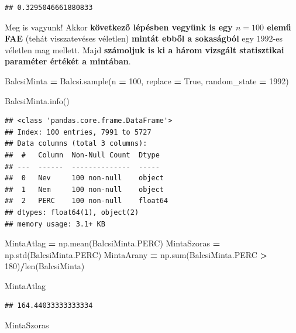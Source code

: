 \documentclass[
]{book}
\newenvironment{Shaded}{\begin{snugshade}}{\end{snugshade}}
\newcommand{\BuiltInTok}[1]{#1}
\newcommand{\DecValTok}[1]{\textcolor[rgb]{0.00,0.00,0.81}{#1}}
\newcommand{\NormalTok}[1]{#1}
\newcommand{\OperatorTok}[1]{\textcolor[rgb]{0.81,0.36,0.00}{\textbf{#1}}}
\newcommand{\VariableTok}[1]{\textcolor[rgb]{0.00,0.00,0.00}{#1}}
\begin{document}
\begin{verbatim}
## 0.3295046661880833
\end{verbatim}

Meg is vagyunk! Akkor \textbf{következő lépésben vegyünk is egy \(n=100\) elemű FAE} (tehát visszatevéses véletlen) \textbf{mintát ebből a sokaságból} egy \(1992\)-es véletlen mag mellett. Majd \textbf{számoljuk is ki a három vizsgált statisztikai paraméter értékét a mintában}.

\begin{Shaded}
\begin{Highlighting}[]
\NormalTok{BalcsiMinta }\OperatorTok{=}\NormalTok{ Balcsi.sample(n }\OperatorTok{=} \DecValTok{100}\NormalTok{, replace }\OperatorTok{=} \VariableTok{True}\NormalTok{, random\_state }\OperatorTok{=} \DecValTok{1992}\NormalTok{)}

\NormalTok{BalcsiMinta.info()}
\end{Highlighting}
\end{Shaded}

\begin{verbatim}
## <class 'pandas.core.frame.DataFrame'>
## Index: 100 entries, 7991 to 5727
## Data columns (total 3 columns):
##  #   Column  Non-Null Count  Dtype  
## ---  ------  --------------  -----  
##  0   Nev     100 non-null    object 
##  1   Nem     100 non-null    object 
##  2   PERC    100 non-null    float64
## dtypes: float64(1), object(2)
## memory usage: 3.1+ KB
\end{verbatim}

\begin{Shaded}
\begin{Highlighting}[]
\NormalTok{MintaAtlag }\OperatorTok{=}\NormalTok{ np.mean(BalcsiMinta.PERC)}
\NormalTok{MintaSzoras }\OperatorTok{=}\NormalTok{ np.std(BalcsiMinta.PERC)}
\NormalTok{MintaArany }\OperatorTok{=}\NormalTok{ np.}\BuiltInTok{sum}\NormalTok{(BalcsiMinta.PERC }\OperatorTok{\textgreater{}} \DecValTok{180}\NormalTok{)}\OperatorTok{/}\BuiltInTok{len}\NormalTok{(BalcsiMinta)}

\NormalTok{MintaAtlag}
\end{Highlighting}
\end{Shaded}

\begin{verbatim}
## 164.44033333333334
\end{verbatim}

\begin{Shaded}
\begin{Highlighting}[]
\NormalTok{MintaSzoras}
\end{Highlighting}
\end{Shaded}
\end{document}
